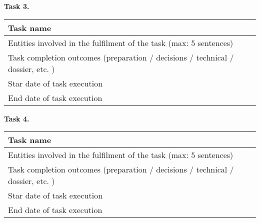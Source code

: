 \begin{description}
    \item \hspace*{8mm}\textbf{Task 3.}\\[5mm]
    \begin{tabular}{|p{5cm}|p{7cm}|}
        \hline
        Task name                                                                       & \\
        \hline
        Entities involved in the fulfilment of the task (max: 5 sentences)              & \\
        \hline
        Task completion outcomes (preparation / decisions / technical / dossier, etc. ) & \\
        \hline
        Star date of task execution                                                     & \\
        \hline
        End date of task execution                                                      & \\
        \hline
    \end{tabular}
    \item \hspace*{8mm}\textbf{Task 4.}\\[5mm]
    \begin{tabular}{|p{5cm}|p{7cm}|}
        \hline
        Task name                                                                       & \\
        \hline
        Entities involved in the fulfilment of the task (max: 5 sentences)              & \\
        \hline
        Task completion outcomes (preparation / decisions / technical / dossier, etc. ) & \\
        \hline
        Star date of task execution                                                     & \\
        \hline
        End date of task execution                                                      & \\
        \hline
    \end{tabular}
\end{description}

